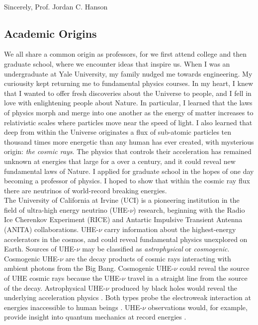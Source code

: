\documentclass[../../main.tex]{subfiles}
\begin{document}
\\
\vspace{0.25cm}
Sincerely,
Prof. Jordan C. Hanson

\subsection{Academic Origins}
\label{sec:origin}

We all share a common origin as professors, for we first attend college and then graduate school, where we encounter ideas that inspire us.  When I was an undergraduate at Yale University, my family nudged me towards engineering.  My curiousity kept returning me to fundamental physics courses.  In my heart, I knew that I wanted to offer fresh discoveries about the Universe to people, and I fell in love with enlightening people about Nature.  In particular, I learned that the laws of physics morph and merge into one another as the energy of matter increases to relativistic scales where particles move near the speed of light.  I also learned that deep from within the Universe originates a flux of sub-atomic particles ten thousand times more energetic than any human has ever created, with mysterious origin: \textit{the cosmic rays}.  The physics that controls their acceleration has remained unknown at energies that large for a over a century, and it could reveal new fundamental laws of Nature.  I applied for graduate school in the hopes of one day becoming a professor of physics.  I hoped to show that within the cosmic ray flux there are neutrinos of world-record breaking energies.
\\
\vspace{0.25cm}
The University of California at Irvine (UCI) is a pioneering institution in the field of ultra-high energy neutrino (UHE-$\nu$) research, beginning with the Radio Ice Cherenkov Experiment (RICE) \cite{PhysRevD.85.062004} and Antartic Impulsive Transient Antenna (ANITA) \cite{PhysRevD.99.122001} collaborations.  UHE-$\nu$ carry information about the highest-energy accelerators in the cosmos, and could reveal fundamental physics unexplored on Earth.  Sources of UHE-$\nu$ may be classified as \textit{astrophysical} or \textit{cosmogenic}.  Cosmogenic UHE-$\nu$ are the decay products of cosmic rays interacting with ambient photons from the Big Bang.  Cosmogenic UHE-$\nu$ could reveal the source of UHE cosmic rays because the UHE-$\nu$ travel in a straight line from the source of the decay.  Astrophysical UHE-$\nu$ produced by black holes would reveal the underlying acceleration physics \cite{Astro2020_1}.  Both types probe the electroweak interaction at energies inaccessible to human beings \cite{Astro2020_2}.  UHE-$\nu$ observations would, for example, provide insight into quantum mechanics at record energies \cite{PhysRevD.83.113009}.
\end{document}
